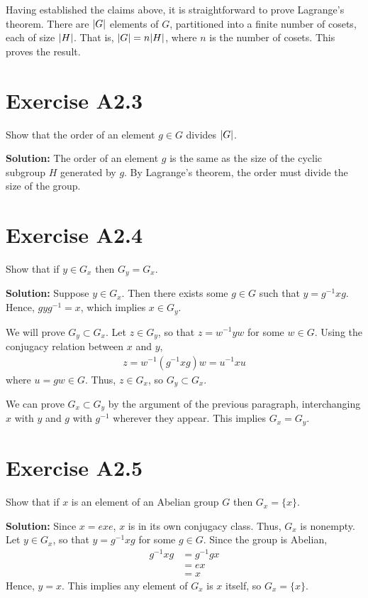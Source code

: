 \documentclass{book}
\begin{document}
    Having established the claims above, it is straightforward to prove Lagrange's theorem. There are $\abs{G}$ elements of $G$, partitioned into a finite number of cosets, each of size $\abs{H}$. That is, $\abs{G} = n\abs{H}$, where $n$ is the number of cosets. This proves the result.
    
\section*{Exercise A2.3}
    Show that the order of an element $g\in G$ divides $\abs{G}$.
    
    \textbf{Solution:} The order of an element $g$ is the same as the size of the cyclic subgroup $H$ generated by $g$. By Lagrange's theorem, the order must divide the size of the group.
    
\section*{Exercise A2.4}
    Show that if $y\in G_x$ then $G_y = G_x$.
    
    \textbf{Solution:} Suppose $y\in G_x$. Then there exists some $g\in G$ such that $y=g^{-1} x g$. Hence, $g y g^{-1} = x$, which implies $x \in G_y$. 
    
    We will prove $G_y \subset G_x$. Let $z \in G_y$, so that $z = w^{-1}y w$ for some $w\in G$. Using the conjugacy relation between $x$ and $y$,
    \begin{align}
        z = w^{-1}(g^{-1}xg)w = u^{-1}x u
    \end{align}
    where $u = gw \in G$. Thus, $z \in G_x$, so $G_y \subset G_x$.
    
    We can prove $G_x \subset G_y$ by the argument of the previous paragraph, interchanging $x$ with $y$ and $g$ with $g^{-1}$ wherever they appear. This implies $G_x = G_y$. 

\section*{Exercise A2.5}
    Show that if $x$ is an element of an Abelian group $G$ then $G_x = \{x\}$.
    
    \textbf{Solution:} Since $x = exe$, $x$ is in its own conjugacy class. Thus, $G_x$ is nonempty. Let $y \in G_x$, so that $y = g^{-1}x g$ for some $g\in G$. Since the group is Abelian,
    \begin{align}
        g^{-1}xg &= g^{-1}g x \\
        &= ex \\
        &= x
    \end{align}
    Hence, $y=x$. This implies any element of $G_x$ is $x$ itself, so $G_x = \{x\}$.
    
\end{document}

